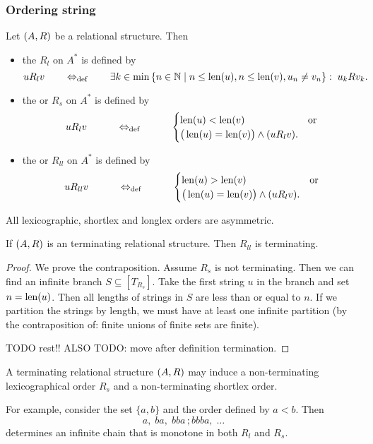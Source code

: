 \subsubsection{Ordering string}
\begin{definition}
Let $\left( A,R \right)$ be a relational structure. Then
\begin{itemize}
\item the  $R_l$ on $A^*$ is defined by
\[ u R_l v \quad\quad\Leftrightarrow_{\text{def}}\quad\quad \text{$\exists k \in \min\left\{ n\in\mathbb{N} \;\middle|\; n \leq \operatorname{len}(u), n\leq \operatorname{len}(v), u_n \neq v_n \right\}: \; u_k R v_k$}. \]
\item the  or  $R_{s}$ on $A^*$ is defined by
\[ u R_l v \qquad\quad\Leftrightarrow_{\text{def}}\quad\qquad \begin{cases}
\operatorname{len}(u) < \operatorname{len}(v) & \text{or} \\
\big(\operatorname{len}(u) = \operatorname{len}(v)\big) \land (u R_l v).
\end{cases}\]
\item the  or $R_{ll}$ on $A^*$ is defined by
\[ u R_{ll} v \qquad\quad\Leftrightarrow_{\text{def}}\quad\qquad \begin{cases}
\operatorname{len}(u) > \operatorname{len}(v) & \text{or} \\
\big(\operatorname{len}(u) = \operatorname{len}(v)\big) \land (u R_l v).
\end{cases}\]
\end{itemize}
\end{definition}

\begin{lemma}
All lexicographic, shortlex and longlex orders are asymmetric.
\end{lemma}

\begin{proposition}
If $\left( A,R \right)$ is an terminating relational structure. Then $R_{ll}$ is terminating.
\end{proposition}
\begin{proof}
We prove the contraposition. Assume $R_s$ is not terminating. Then we can find an infinite branch $S\subseteq [T_{R_s}]$. Take the first string $u$ in the branch and set $n = \operatorname{len}(u)$. Then all lengths of strings in $S$ are less than or equal to $n$. If we partition the strings by length, we must have at least one infinite partition (by the contraposition of: finite unions of finite sets are finite).

TODO rest!! ALSO TODO: move after definition termination.
\end{proof}

\begin{example}
A terminating relational structure $\left( A,R \right)$ may induce a non-terminating lexicographical order $R_s$ and a non-terminating shortlex order.

For example, consider the set $\{a,b\}$ and the order defined by $a<b$. Then
\[ a,\; ba,\; bba\,; bbba,\; \ldots \]
determines an infinite chain that is monotone in both $R_l$ and $R_s$.
\end{example}

